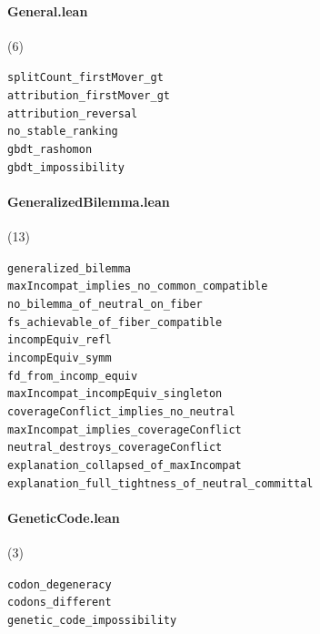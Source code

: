 \paragraph{General.lean} (6)

{\footnotesize
\texttt{splitCount\_firstMover\_gt}\\
\texttt{attribution\_firstMover\_gt}\\
\texttt{attribution\_reversal}\\
\texttt{no\_stable\_ranking}\\
\texttt{gbdt\_rashomon}\\
\texttt{gbdt\_impossibility}\\
}

\paragraph{GeneralizedBilemma.lean} (13)

{\footnotesize
\texttt{generalized\_bilemma}\\
\texttt{maxIncompat\_implies\_no\_common\_compatible}\\
\texttt{no\_bilemma\_of\_neutral\_on\_fiber}\\
\texttt{fs\_achievable\_of\_fiber\_compatible}\\
\texttt{incompEquiv\_refl}\\
\texttt{incompEquiv\_symm}\\
\texttt{fd\_from\_incomp\_equiv}\\
\texttt{maxIncompat\_incompEquiv\_singleton}\\
\texttt{coverageConflict\_implies\_no\_neutral}\\
\texttt{maxIncompat\_implies\_coverageConflict}\\
\texttt{neutral\_destroys\_coverageConflict}\\
\texttt{explanation\_collapsed\_of\_maxIncompat}\\
\texttt{explanation\_full\_tightness\_of\_neutral\_committal}\\
}

\paragraph{GeneticCode.lean} (3)

{\footnotesize
\texttt{codon\_degeneracy}\\
\texttt{codons\_different}\\
\texttt{genetic\_code\_impossibility}\\
}

